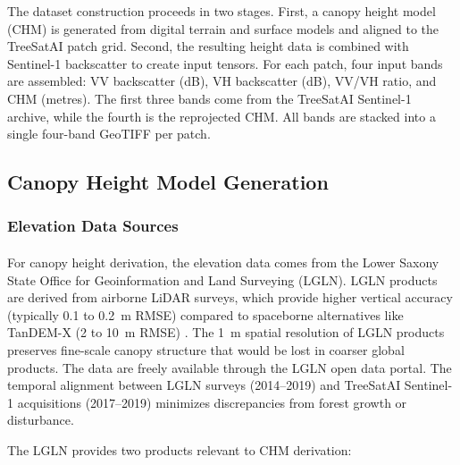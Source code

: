 The dataset construction proceeds in two stages. First, a canopy height model (CHM) is generated from digital terrain and surface models and aligned to the TreeSatAI patch grid. Second, the resulting height data is combined with Sentinel-1 backscatter to create input tensors. For each patch, four input bands are assembled: VV backscatter (dB), VH backscatter (dB), VV/VH ratio, and CHM (metres). The first three bands come from the TreeSatAI Sentinel-1 archive, while the fourth is the reprojected CHM. All bands are stacked into a single four-band GeoTIFF per patch.

\subsection{Canopy Height Model Generation}
\label{subsec:chm_generation}

\subsubsection{Elevation Data Sources}

\paragraph{}

For canopy height derivation, the elevation data comes from the Lower Saxony State Office for Geoinformation and Land Surveying (LGLN). LGLN products are derived from airborne LiDAR surveys, which provide higher vertical accuracy (typically 0.1 to 0.2~m RMSE) \cite{landesamt_fur_geoinformation_und_landesvermessung_niedersachsen_lgln_digitales_2025,landesamt_fur_geoinformation_und_landesvermessung_niedersachsen_lgln_digitales_2025-1} compared to spaceborne alternatives like TanDEM-X (2 to 10~m RMSE) \cite{wessel_accuracy_2018}. The \SI{1}{\meter} spatial resolution of LGLN products preserves fine-scale canopy structure that would be lost in coarser global products. The data are freely available through the LGLN open data portal. The temporal alignment between LGLN surveys (2014--2019) and TreeSatAI Sentinel-1 acquisitions (2017--2019) minimizes discrepancies from forest growth or disturbance.

The LGLN provides two products relevant to CHM derivation:

